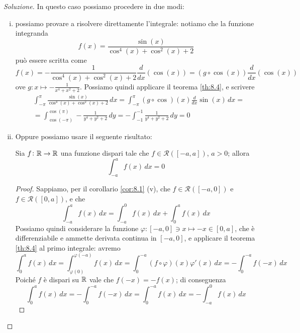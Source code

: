 \begin{proof}[Soluzione]
    In questo caso possiamo procedere in due modi: 
    \begin{enumerate}[(i)]
        \item possiamo provare a risolvere direttamente l'integrale: notiamo che la funzione integranda
        \[
        f(x) = \frac{\sin(x)}{\cos^4(x)+\cos^2(x)+2}
        \]
        può essere scritta come
        \[
        f(x) = -\frac{1}{\cos^4(x)+\cos^2(x)+2}\frac{d}{dx}(\cos(x)) = (g \circ \cos(x))\frac{d}{dx}(\cos(x))
        \]
        ove $g\colon x \mapsto -\frac{1}{x^4+x^2+2}$. Possiamo quindi applicare il teorema \ref{th:8.4}, e scrivere
        \[
        \begin{split}
            &\int_{-\pi}^\pi  \frac{\sin(x)}{\cos^4(x)+\cos^2(x)+2}\, dx = \int_{-\pi}^\pi (g\circ \cos)(x) \frac{d}{dx}\sin(x)\, dx = \\
            & = \int_{\cos(-\pi)}^{\cos(\pi)}-\frac{1}{y^4+y^2+2}\, dy = -\int_{-1}^{-1} \frac{1}{y^4+y^2+2}\, dy = 0
        \end{split}
        \]   
        \item Oppure possiamo usare il seguente risultato:
        \begin{tcolorbox}
            \begin{proposition}
                \label{prop:8.1}
                Sia $f\colon\amsbb{R}\to \amsbb{R}$ una funzione dispari tale che $f\in\mathscr{R}([-a,a])$, $a>0$; allora
                \[
                \int_{-a}^a f(x)\, dx = 0
                \]
            \end{proposition}
            \begin{proof}
                Sappiamo, per il corollario \ref{cor:8.1} (v), che $f\in\mathscr{R}([-a,0])$ e $f\in\mathscr{R}([0,a])$, e che
                \[
                \int_{-a}^a f(x)\, dx = \int_{-a}^0 f(x)\, dx + \int_0^a f(x)\, dx
                \]
                Possiamo quindi considerare la funzione $\varphi\colon [-a,0]\ni x \mapsto -x\in[0,a]$, che è differenziabile e ammette derivata continua in $[-a,0]$, e applicare il teorema \ref{th:8.4} al primo integrale: avremo
                \[
                \int_{0}^a f(x)\, dx = \int_{\varphi(0)}^{\varphi(-a)}f(x)\, dx =  \int_{0}^{-a} (f \circ \varphi)(x) \varphi'(x)\, dx = -\int_{0}^{-a} f(-x)\, dx
                \]
                Poiché $f$ è dispari su $\amsbb{R}$ vale che $f(-x) = -f(x)$; di conseguenza
                \[
                \int_{0}^a f(x)\, dx = -\int_0^{-a} f(-x)\, dx = \int_0^{-a} f(x)\, dx = -\int_{-a}^0 f(x)\, dx
\]
\end{proof}
\end{tcolorbox}
\end{enumerate}
\end{proof}
